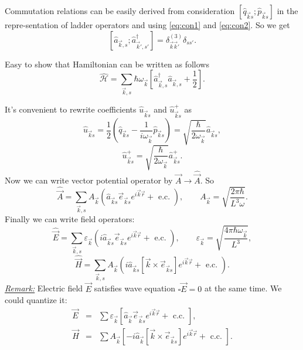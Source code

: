 	Commutation relations can be easily derived from consideration $\left[ \hat{q}_{\vec{k}s} ; \hat{p}_{\vec{k}s} \right]$ in the repre-sentation  of ladder operators and using \eqref{eq:con1} and \eqref{eq:con2}. So we get
	\begin{equation}
		\left[ \hat{a}_{\vec{k},s} ; \hat{a}^{\dagger}_{\vec{k}',s'} \right] = \delta^{(3)}_{\vec{k}\vec{k}'} \delta_{ss'}.
	\end{equation}
	
	Easy to  show that Hamiltonian can be written as follows
	\begin{equation}
		\hat{\mathscr{H}} = \sum_{\vec{k},s} \hbar \omega_{\vec{k}} \left[ \hat{a}^{\dagger}_{\vec{k},s} \hat{a}_{\vec{k},s} + \frac{1}{2} \right].
	\end{equation}
	
	It's convenient to rewrite coefficients $\hat{u}_{\vec{k}s}$ and $\hat{u}^+_{\vec{k}s}$ as
	\begin{equation}
		\hat{u}_{\vec{k}s} = \frac{1}{2} \left( \hat{q}_{\vec{k}s} - \frac{1}{i \omega_{\vec{k}}} \hat{p}_{\vec{k}s}  \right) = \sqrt{\frac{\hbar}{2 \omega_{\vec{k}}}} \hat{a}_{\vec{k}s},
	\end{equation}
	\begin{equation}
		\hat{u}^+_{\vec{k}s} = \sqrt{\frac{\hbar}{2 \omega_{\vec{k}}}} \hat{a}^+_{\vec{k}s}.
	\end{equation}
	Now we can write vector potential operator by $\vec{A} \to \hat{\vec{A}}$. So
	\begin{equation}
		\boxed{\hat{\vec{A}} = \sum_{\vec{k},s} A_{\vec{k}} \left( \hat{a}_{\vec{k}s} \vec{e}_{\vec{k}s} e^{i \vec{k} \vec{r}} + \text{ e.c. } \right), \qquad A_{\vec{k}} = \sqrt{\frac{2 \pi \hbar}{L^3 \omega}}.}
	\end{equation}
	Finally we can write field operators:
	\begin{equation}
		\boxed{\hat{\vec{E}} = \sum_{\vec{k},s} \varepsilon_{\vec{k}} \left( i \hat{a}_{\vec{k}s} \vec{e}_{\vec{k}s} e^{i \vec{k} \vec{r}} + \text{ e.c. } \right), \qquad \varepsilon_{\vec{k}} = \sqrt{\frac{4 \pi \hbar \omega_{\vec{k}}}{L^3}},}
	\end{equation}
	\begin{equation}
		\boxed{\hat{\vec{H}} = \sum_{\vec{k},s} A_{\vec{k}} \left( i \hat{a}_{\vec{k}s} \left[ \vec{k} \times \vec{e}_{\vec{k}s} \right] e^{i \vec{k} \vec{r}} + \text{ e.c. } \right).}
	\end{equation}
	\textit{\underline{Remark:}} Electric field $\vec{E}$ satisfies  wave equation $\square \vec{E} = 0$ at the same time. We could quantize it:
	\begin{eqnarray}
		\vec{E} &=& \sum \varepsilon_{\vec{k}} \left[ \hat{a}_{\vec{k}} \vec{e}_{\vec{k}s} e^{i \vec{k} \vec{r}} + \text{ c.c. } \right], \\
		\vec{H} &=& \sum A_{\vec{k}} \left[ -i\hat{a}_{\vec{k}} \left[ \vec{k} \times \vec{e}_{\vec{k}s} \right] e^{i\vec{k}\vec{r}} + \text{ c.c. } \right].
	\end{eqnarray}
	
